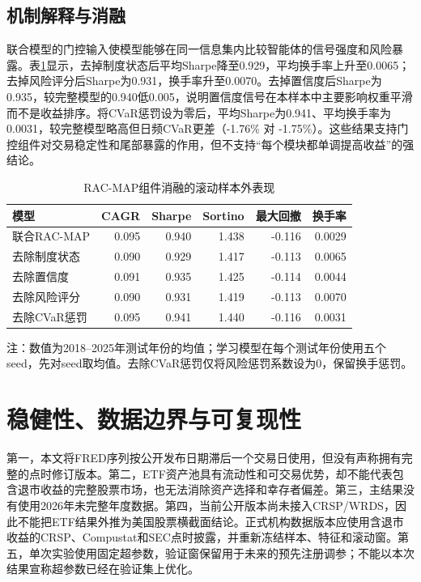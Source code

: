 \documentclass[UTF8,a4paper,zihao=-4]{ctexart}
\begin{document}
\subsection{机制解释与消融}
联合模型的门控输入使模型能够在同一信息集内比较智能体的信号强度和风险暴露。表\ref{tab:ablation}显示，去掉制度状态后平均Sharpe降至0.929，平均换手率上升至0.0065；去掉风险评分后Sharpe为0.931，换手率升至0.0070。去掉置信度后Sharpe为0.935，较完整模型的0.940低0.005，说明置信度信号在本样本中主要影响权重平滑而不是收益排序。将CVaR惩罚设为零后，平均Sharpe为0.941、平均换手率为0.0031，较完整模型略高但日频CVaR更差（-1.76\% 对 -1.75\%）。这些结果支持门控组件对交易稳定性和尾部暴露的作用，但不支持“每个模块都单调提高收益”的强结论。

\begin{table}[htbp]
\centering
\caption{RAC-MAP组件消融的滚动样本外表现}
\label{tab:ablation}
\small
\begin{tabular}{lrrrrr}
\toprule
模型 & CAGR & Sharpe & Sortino & 最大回撤 & 换手率 \\
\midrule
联合RAC-MAP & 0.095 & 0.940 & 1.438 & -0.116 & 0.0029 \\
去除制度状态 & 0.090 & 0.929 & 1.417 & -0.113 & 0.0065 \\
去除置信度 & 0.091 & 0.935 & 1.425 & -0.114 & 0.0044 \\
去除风险评分 & 0.090 & 0.931 & 1.419 & -0.113 & 0.0070 \\
去除CVaR惩罚 & 0.095 & 0.941 & 1.440 & -0.116 & 0.0031 \\
\bottomrule
\end{tabular}
\begin{tablenotes}[flushleft]
\item[]\footnotesize 注：数值为2018--2025年测试年份的均值；学习模型在每个测试年份使用五个seed，先对seed取均值。去除CVaR惩罚仅将风险惩罚系数设为0，保留换手惩罚。
\end{tablenotes}
\end{table}

\section{稳健性、数据边界与可复现性}
第一，本文将FRED序列按公开发布日期滞后一个交易日使用，但没有声称拥有完整的点时修订版本。第二，ETF资产池具有流动性和可交易优势，却不能代表包含退市收益的完整股票市场，也无法消除资产选择和幸存者偏差。第三，主结果没有使用2026年未完整年度数据。第四，当前公开版本尚未接入CRSP/WRDS，因此不能把ETF结果外推为美国股票横截面结论。正式机构数据版本应使用含退市收益的CRSP、Compustat和SEC点时披露，并重新冻结样本、特征和滚动窗。第五，单次实验使用固定超参数，验证窗保留用于未来的预先注册调参；不能以本次结果宣称超参数已经在验证集上优化。
\end{document}
